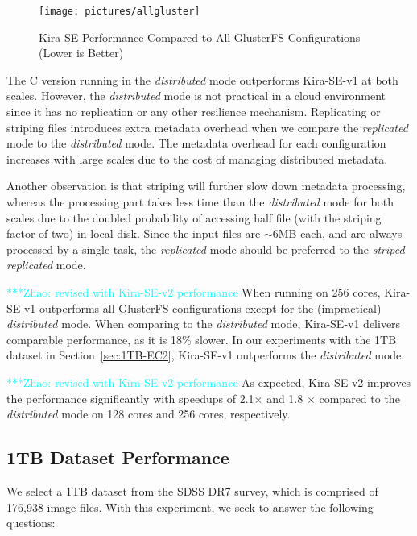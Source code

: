 \documentclass[10pt,journal,compsoc]{IEEEtran}
\newcommand{\zhaonote}[1]{{\textcolor{cyan}    { ***Zhao:      #1 }}}
\newcommand{\zhaonote}[1]{}
\begin{document}
\begin{figure}[h]
	\begin{center}
		\texttt{[image: pictures/allgluster]}
		\caption{Kira SE Performance Compared to All GlusterFS Configurations (Lower is Better)
		\label{fig:allgluster}}
  	\end{center}
\end{figure}

The C version running in the \emph{distributed} mode outperforms Kira-SE-v1 at both scales. 
However, the \emph{distributed} mode is not practical in a cloud environment since
it has no replication or any other resilience mechanism. Replicating or striping
files introduces extra metadata overhead when we compare the \emph{replicated} mode
to the \emph{distributed} mode. The metadata overhead for each configuration increases
with large scales due to the cost of managing distributed metadata.

Another observation is that striping will further slow down metadata processing, whereas the
processing part takes less time than the \emph{distributed} mode for both scales due
to the doubled probability of accessing half file (with the striping factor of two) in local disk.
Since the input files are $\sim$6MB each, and are always processed by a single task, the
\emph{replicated} mode should be preferred to the \emph{striped replicated} mode.

\zhaonote{revised with Kira-SE-v2 performance}
When running on 256 cores, Kira-SE-v1 outperforms all GlusterFS configurations except for the (impractical) \emph{distributed}
mode. When comparing to the \emph{distributed} mode, Kira-SE-v1 delivers comparable performance, as it is 18\% slower. 
In our experiments with the 1TB dataset in Section~\ref{sec:1TB-EC2}, 
Kira-SE-v1 outperforms the \emph{distributed} mode.

\zhaonote{revised with Kira-SE-v2 performance}
As expected, Kira-SE-v2 improves the performance significantly with speedups of 2.1$\times$ and 1.8 $\times$
compared to the \emph{distributed} mode on 128 cores and 256 cores, respectively.

\subsection{1TB Dataset Performance}
\label{sec:Performance-1TB}

We select a 1TB dataset from the SDSS DR7 survey, which is comprised of 176,938 image files. 
With this experiment, we seek to answer the following questions: 
\end{document}
